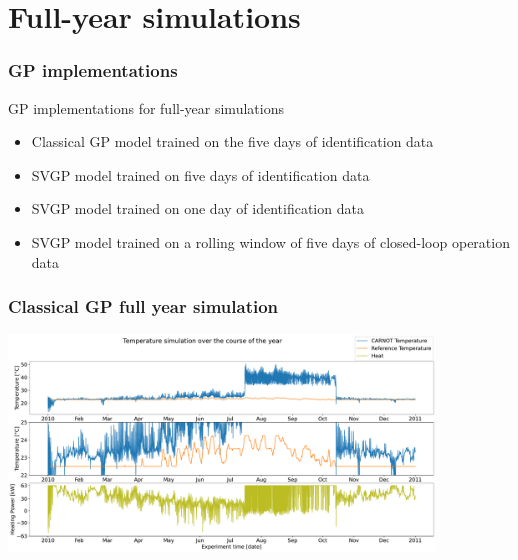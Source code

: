 \section{Full-year simulations}


\begin{frame}
    \frametitle{GP implementations}
    \begin{block}{GP implementations for full-year simulations}
        \vspace{10pt}
        \begin{itemize}
            \item Classical GP model trained on the five days of identification
                data \vspace{10pt}
            \item SVGP model trained on five days of identification data
                \vspace{10pt}
            \item SVGP model trained on one day of identification data
                \vspace{10pt}
            \item SVGP model trained on a rolling window of five days of
                closed-loop operation data \vspace{10pt}
        \end{itemize}
    \end{block}
\end{frame}

\begin{frame}
    \frametitle{Classical GP full year simulation}
    \centering
    \includegraphics[width=0.85\textwidth]{Plots/4_GP_480pts_12_averageYear_fullyear.pdf}
\end{frame}

